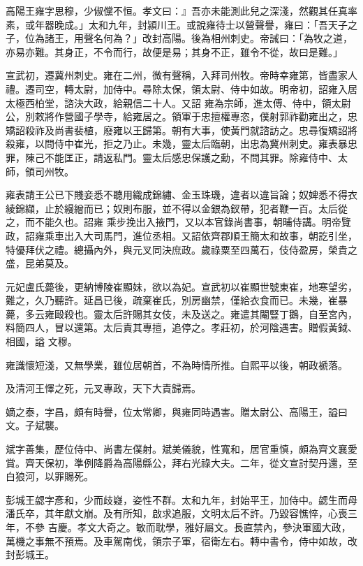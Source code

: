 \begin{pinyinscope}
 高陽王雍字思穆，少俶儻不恒。孝文曰：』吾亦未能測此兒之深淺，然觀其任真率素，或年器晚成。」太和九年，封潁川王。或說雍待士以營聲譽，雍曰：「吾天子之子，位為諸王，用聲名何為？」改封高陽。後為相州刺史。帝誡曰：「為牧之道，亦易亦難。其身正，不令而行，故便是易；其身不正，雖令不從，故曰是難。」



 宣武初，遷冀州刺史。雍在二州，微有聲稱，入拜司州牧。帝時幸雍第，皆盡家人禮。遷司空，轉太尉，加侍中。尋除太保，領太尉、侍中如故。明帝初，詔雍入居太極西柏堂，諮決大政，給親信二十人。又詔
 雍為宗師，進太傅、侍中，領太尉公，別敕將作營國子學寺，給雍居之。領軍于忠擅權專恣，僕射郭祚勸雍出之，忠矯詔殺祚及尚書裴植，廢雍以王歸第。朝有大事，使黃門就諮訪之。忠尋復矯詔將殺雍，以問侍中崔光，拒之乃止。未幾，靈太后臨朝，出忠為冀州刺史。雍表暴忠罪，陳己不能匡正，請返私門。靈太后感忠保護之勳，不問其罪。除雍侍中、太師，領司州牧。



 雍表請王公已下賤妾悉不聽用織成錦繡、金玉珠璣，違者以違旨論；奴婢悉不得衣綾錦纈，止於縵繒而已；奴則布服，並不得以金銀為釵帶，犯者鞭一百。太后從之，而不能久也。詔雍
 乘步挽出入掖門，又以本官錄尚書事，朝晡侍講。明帝覽政，詔雍乘車出入大司馬門，進位丞相。又詔依齊郡順王簡太和故事，朝訖引坐，特優拜伏之禮。總攝內外，與元叉同決庶政。歲祿粟至四萬石，伎侍盈房，榮貴之盛，昆弟莫及。



 元妃盧氏薨後，更納博陵崔顯妹，欲以為妃。宣武初以崔顯世號東崔，地寒望劣，難之，久乃聽許。延昌已後，疏棄崔氏，別房幽禁，僅給衣食而已。未幾，崔暴薨，多云雍毆殺也。靈太后許賜其女伎，未及送之。雍遣其閹豎丁鵝，自至宮內，料簡四人，冒以還第。太后責其專擅，追停之。孝莊初，於河陰遇害。贈假黃鉞、相國，謚
 文穆。



 雍識懷短淺，又無學業，雖位居朝首，不為時情所推。自熙平以後，朝政褫落。



 及清河王懌之死，元叉專政，天下大責歸焉。



 嫡之泰，字昌，頗有時譽，位太常卿，與雍同時遇害。贈太尉公、高陽王，謚曰文。子斌襲。



 斌字善集，歷位侍中、尚書左僕射。斌美儀貌，性寬和，居官重慎，頗為齊文襄愛賞。齊天保初，準例降爵為高陽縣公，拜右光祿大夫。二年，從文宣討契丹還，至白狼河，以罪賜死。



 彭城王勰字彥和，少而歧嶷，姿性不群。太和九年，封始平王，加侍中。勰生而母潘氏卒，其年獻文崩。及有所知，啟求追服，文明太后不許。乃毀容憔悴，心喪三年，不參
 吉慶。孝文大奇之。敏而耽學，雅好屬文。長直禁內，參決軍國大政，萬機之事無不預焉。及車駕南伐，領宗子軍，宿衛左右。轉中書令，侍中如故，改封彭城王。




\end{pinyinscope}
